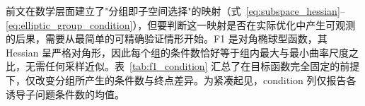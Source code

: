 前文在数学层面建立了"分组即子空间选择"的映射（式~\eqref{eq:subspace_hessian}--\eqref{eq:elliptic_group_condition}），但要判断这一映射是否在实际优化中产生可观测的后果，需要从最简单的可精确验证情形开始。F1 是对角椭球型函数，其 Hessian 呈严格对角形，因此每个组的条件数恰好等于组内最大与最小曲率尺度之比，无需任何采样近似。表~\ref{tab:f1_condition} 汇总了在目标函数完全固定的前提下，仅改变分组所产生的条件数与终点差异。为紧凑起见，condition 列仅报告各诱导子问题条件数的均值。
